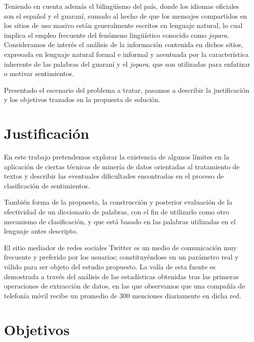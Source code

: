 Teniendo en cuenta adem\'as el biling\"uismo del pa\'is, donde los idiomas oficiales son el espa\~nol y el guaran\'i, sumado al hecho de que los mensajes compartidos en los sitios de uso masivo est\'an generalmente escritos en lenguaje natural, lo cual implica el empleo frecuente del fen\'omeno ling\"u\'istico conocido como \textit{jopara}. Consideramos de inter\'es el an\'alisis de la informaci\'on contenida en dichos sitios, expresada en lenguaje natural formal e informal y acentuada por la caracter\'istica inherente de las palabras del guaran\'i y el \textit{jopara}, que son utilizadas para enfatizar o motivar sentimientos.
\newline

Presentado el escenario del problema a tratar, pasamos a describir la justificaci\'on y los objetivos trazados en la propuesta de soluci\'on.

\section{Justificaci\'on}

En este trabajo pretendemos explorar la existencia de algunos l\'imites en la aplicaci\'on de ciertas t\'ecnicas de miner\'ia de datos orientadas al tratamiento de textos y describir las eventuales dificultades encontradas en el proceso de clasificaci\'on de sentimientos.
\newline

Tambi\'en forma de la propuesta, la construcci\'on y posterior evaluaci\'on de la efectividad de un diccionario de palabras, con el fin de utilizarlo como otro mecanismo de clasificaci\'on, y que est\'a basado en las palabras utilizadas en el lenguaje antes descripto.
\newline

El sitio mediador de redes sociales Twitter es un medio de comunicaci\'on muy frecuente y preferido por los usuarios; constituy\'endose en un par\'ametro real y v\'alido para ser objeto del estudio propuesto. La val\'ia de esta fuente es demostrada a trav\'es del an\'alisis de las estad\'isticas obtenidas tras las primeras operaciones de extracci\'on de datos, en las que observamos que una compa\~n\'ia de telefon\'ia m\'ovil recibe un promedio de 300 menciones diariamente en dicha red.


\section{Objetivos}

